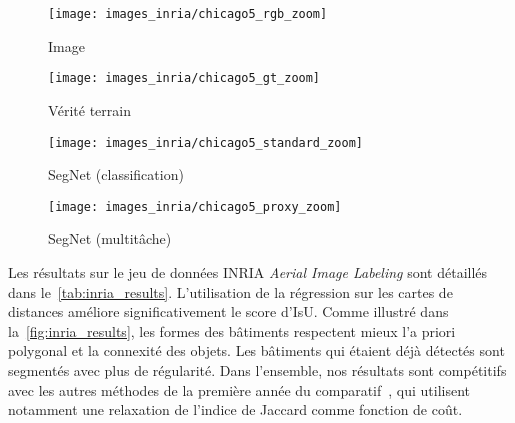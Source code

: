 \begin{figure*}[t]
  \captionsetup{justification=centering,width=0.9\textwidth}
  \begin{subfigure}[t]{0.24\textwidth}
  	\texttt{[image: images\_inria/chicago5\_rgb\_zoom]}
      \caption*{Image }
  \end{subfigure}
  \begin{subfigure}[t]{0.24\textwidth}
  	\texttt{[image: images\_inria/chicago5\_gt\_zoom]}
      \caption*{Vérité terrain}
  \end{subfigure}
  \begin{subfigure}[t]{0.24\textwidth}
  	\texttt{[image: images\_inria/chicago5\_standard\_zoom]}
      \caption*{SegNet (classification)}
  \end{subfigure}
  \begin{subfigure}[t]{0.24\textwidth}
  	\texttt{[image: images\_inria/chicago5\_proxy\_zoom]}
      \caption*{SegNet (multitâche)}
  \end{subfigure}
\captionsetup{justification=justified,width=\textwidth}
\label{fig:inria_results}
\end{figure*}

Les résultats sur le jeu de données INRIA \emph{Aerial Image Labeling} sont détaillés dans le~\cref{tab:inria_results}. L'utilisation de la régression sur les cartes de distances améliore significativement le score d'\gls{IsU}. Comme illustré dans la~\cref{fig:inria_results}, les formes des bâtiments respectent mieux l'a priori polygonal et la connexité des objets. Les bâtiments qui étaient déjà détectés sont segmentés avec plus de régularité. Dans l'ensemble, nos résultats sont compétitifs avec les autres méthodes de la première année du comparatif~\cite{huang_large-scale_2018}, qui utilisent notamment une relaxation de l'indice de Jaccard comme fonction de coût.

